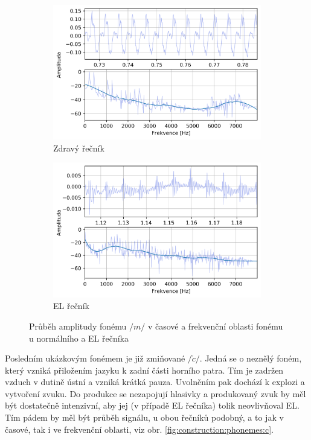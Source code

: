 \begin{figure}[htpb]
  \centering
  \begin{subfigure}[b]{0.45\textwidth}
    \includegraphics[width=\textwidth]{./ch5-construction/img/signal-normal_m.png}
    \caption{Zdravý řečník}
    \label{fig:construction:phonemes:m:normal}
  \end{subfigure}
  \begin{subfigure}[b]{0.45\textwidth}
    \includegraphics[width=\textwidth]{./ch5-construction/img/signal-el_m.png}
    \caption{EL řečník}
    \label{fig:construction:phonemes:m:el}
  \end{subfigure}
  \caption{Průběh amplitudy fonému $/m/$ v časové a frekvenční oblasti fonému u normálního a EL řečníka}
  \label{fig:construction:phonemes:m}
\end{figure}

Posledním ukázkovým fonémem je již zmiňované $/\check{c}/$. Jedná se o neznělý foném, který vzniká přiložením jazyku k zadní části horního patra. Tím je zadržen vzduch v dutině ústní a vzniká krátká pauza. Uvolněním pak dochází k explozi a vytvoření zvuku. \cite{Psutka2006} Do produkce se nezapojují hlasivky a produkovaný zvuk by měl být dostatečně intenzivní, aby jej (v případě EL řečníka) tolik neovlivňoval EL. Tím pádem by měl být průběh signálu, u obou řečníků podobný, a to jak v časové, tak i ve frekvenční oblasti, viz obr. \ref{fig:construction:phonemes:c}.


